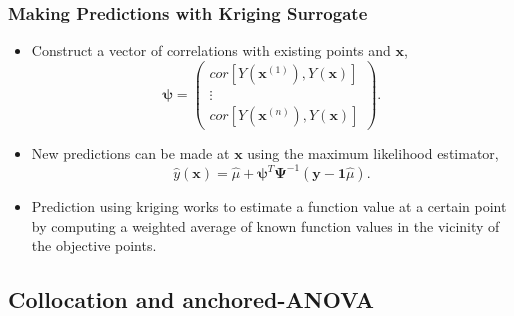 \documentclass{beamer}
\begin{document}
\begin{frame}
\frametitle{Making Predictions with Kriging Surrogate}

\begin{itemize}
  \item Construct a vector of correlations with existing points and $\textbf{x}$,
   \begin{equation}
 	\boldsymbol{\psi} =
 	\begin{pmatrix} 
	 cor[Y(\textbf{x}^{(1)}), Y(\textbf{x})] \\
	 \vdots \\ 
	 cor[Y(\textbf{x}^{(n)}), Y(\textbf{x})] 
    \end{pmatrix}. \nonumber
   \end{equation} 
  \item  New predictions can be made at $\textbf{x}$ using the maximum likelihood estimator,
   \begin{equation}
    \hat{y}(\textbf{x}) = \hat{\mu} + 
   	 \boldsymbol{\psi}^T\boldsymbol{\Psi}^{-1}
   	  \left(\textbf{y} - \textbf{1}\hat{\mu}\right). \nonumber
   \end{equation}
  \item Prediction using kriging works to estimate a function value at a certain point by computing a weighted average of known function values in the vicinity of the objective points.
\end{itemize}

\end{frame}
\subsection{Collocation and anchored-ANOVA}
\end{document}
